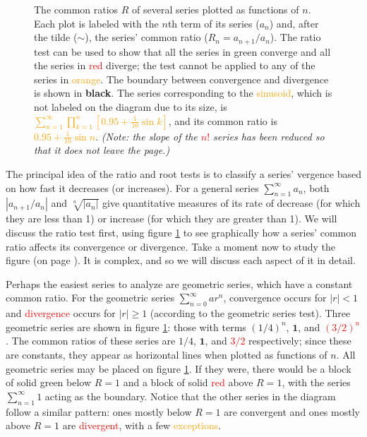 \documentclass{myarticle}
\theoremstyle{nospace}
\newtheorem{old series theorem}{Theorem}
\newenvironment{series theorem}{\begin{mdframed}\begin{old series theorem}}{\end{old series theorem}\end{mdframed}}
\begin{document}
\begin{figure}[htbp]
\begin{tikzpicture}
\end{tikzpicture}
\caption{The common ratios $R$ of several series plotted as functions of $n$. Each plot is labeled with the $n$th term of its series ($a_n$) and, after the tilde ($\sim$), the series' common ratio ($R_n = a_{n+1}/a_n$). The ratio test can be used to show that all the series in \textcolor{black!30!green}{green} converge and all the series in \textcolor{red}{red} diverge; the test cannot be applied to any of the series in \textcolor{orange}{orange}. The boundary between convergence and divergence is shown in \textbf{black}. The series corresponding to the \textcolor{orange}{sinusoid}, which is not labeled on the diagram due to its size, is \textcolor{orange}{$\sum_{n=1}^\infty \prod_{k=1}^n [0.95 + \frac{1}{10} \sin k]$}, and its common ratio is \textcolor{orange}{$0.95 + \frac{1}{10} \sin n$}. \emph{(Note: the slope of the \textcolor{red}{$n!$} series has been reduced so that it does not leave the page.)}}
\label{fig:ratio test}
\end{figure}

The principal idea of the ratio and root tests is to classify a series' vergence based on how fast it decreases (or increases). For a general series $\sum_{n=1}^\infty a_n$, both $|a_{n+1}/a_n|$ and $\sqrt[n]{|a_n|}$ give quantitative measures of its rate of decrease (for which they are less than 1) or increase (for which they are greater than 1). We will discuss the ratio test first, using figure \ref{fig:ratio test} to see graphically how a series' common ratio affects its convergence or divergence. Take a moment now to study the figure (on page \pageref{fig:ratio test}). It is complex, and so we will discuss each aspect of it in detail.

Perhaps the easiest series to analyze are geometric series, which have a constant common ratio. For the geometric series $\sum_{n=0}^\infty ar^n$, \textcolor{nicegreen}{convergence} occurs for $|r| < 1$ and \textcolor{red}{divergence} occurs for $|r| \geq 1$ (according to the geometric series test). Three geometric series are shown in figure \ref{fig:ratio test}: those with terms \textcolor{nicegreen}{$(1/4)^n$}, $\mathbf{1}$, and \textcolor{red}{$(3/2)^n$}. The common ratios of these series are \textcolor{nicegreen}{$1/4$}, $\mathbf{1}$, and \textcolor{red}{$3/2$} respectively; since these are constants, they appear as horizontal lines when plotted as functions of $n$. All geometric series may be placed on figure \ref{fig:ratio test}. If they were, there would be a block of solid \textcolor{nicegreen}{green} below $R = 1$ and a block of solid \textcolor{red}{red} above $R = 1$, with the series $\sum_{n=1}^\infty 1$ acting as the boundary. Notice that the other series in the diagram follow a similar pattern: ones mostly below $R = 1$ are \textcolor{nicegreen}{convergent} and ones mostly above $R = 1$ are \textcolor{red}{divergent}, with a few \textcolor{orange}{exceptions}.
\end{document}
